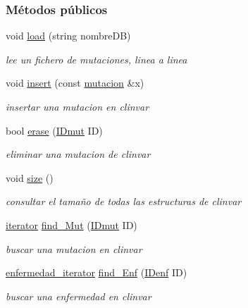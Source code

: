 \subsubsection*{Métodos públicos}
\begin{DoxyCompactItemize}
\item 
void \hyperlink{classclinvar_a9e98448d547cd82c37c7f7ee7b79d239}{load} (string nombre\+DB)
\begin{DoxyCompactList}\small\item\em lee un fichero de mutaciones, linea a linea \end{DoxyCompactList}\item 
void \hyperlink{classclinvar_a9a8b713b5d63e24bf0f802c19d865d5a}{insert} (const \hyperlink{classmutacion}{mutacion} \&x)
\begin{DoxyCompactList}\small\item\em insertar una mutacion en clinvar \end{DoxyCompactList}\item 
bool \hyperlink{classclinvar_ae2e2a20fd1d23c91d295cade508519cf}{erase} (\hyperlink{classclinvar_a4ad33b1d063a729b56ea6ed9e4e2700d}{I\+Dmut} ID)
\begin{DoxyCompactList}\small\item\em eliminar una mutacion de clinvar \end{DoxyCompactList}\item 
void \hyperlink{classclinvar_a65384b423bcfcd19f13c1f5c85dc74e0}{size} ()
\begin{DoxyCompactList}\small\item\em consultar el tamaño de todas las estructuras de clinvar \end{DoxyCompactList}\item 
\hyperlink{classclinvar_1_1iterator}{iterator} \hyperlink{classclinvar_ae82ad0f92abd82275796e91b716c876e}{find\+\_\+\+Mut} (\hyperlink{classclinvar_a4ad33b1d063a729b56ea6ed9e4e2700d}{I\+Dmut} ID)
\begin{DoxyCompactList}\small\item\em buscar una mutacion en clinvar \end{DoxyCompactList}\item 
\hyperlink{classclinvar_a4e04baa8b244566f2c25347c18f036b0}{enfermedad\+\_\+iterator} \hyperlink{classclinvar_adf3960783f536eb6e92b5de00bbbffa9}{find\+\_\+\+Enf} (\hyperlink{classclinvar_a2c121e1c9c137330a57590fe9f4e65ab}{I\+Denf} ID)
\begin{DoxyCompactList}\small\item\em buscar una enfermedad en clinvar \end{DoxyCompactList}\item 

\end{DoxyCompactItemize}
